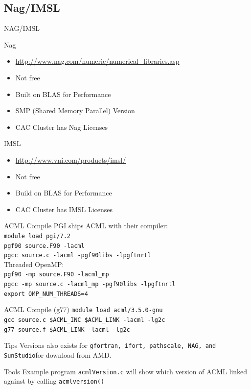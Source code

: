 \documentclass[handout]{beamer}
\begin{document}
\subsection{Nag/IMSL}
\begin{frame}{NAG/IMSL}
 \begin{block}{Nag}
  \begin{itemize}
   \item \url{http://www.nag.com/numeric/numerical\_libraries.asp}
   \item Not free
   \item Built on BLAS for Performance
   \item SMP (Shared Memory Parallel) Version
   \item CAC Cluster has Nag Licenses
  \end{itemize}
 \end{block}
 \begin{block}{IMSL}
  \begin{itemize}
   \item \url{http://www.vni.com/products/imsl/}
   \item Not free
   \item Build on BLAS for Performance
   \item CAC Cluster has IMSL Licenses
  \end{itemize}
 \end{block}
\end{frame}

\begin{frame}{ACML Compile}
PGI ships ACML with their compiler: \\
\texttt{module load pgi/7.2}        \\
\texttt{pgf90 source.F90 -lacml}    \\
\texttt{pgcc  source.c -lacml -pgf90libs -lpgftnrtl} \\
Threaded OpenMP:                    \\
\texttt{pgf90 -mp source.F90 -lacml\_mp}            \\
\texttt{pgcc  -mp source.c   -lacml\_mp -pgf90libs -lpgftnrtl} \\
\texttt{export OMP\_NUM\_THREADS=4}                 \\
\end{frame}
\begin{frame}{ACML Compile (g77)}
\texttt{module load acml/3.5.0-gnu}       \\
\texttt{gcc source.c \$ACML\_INC \$ACML\_LINK -lacml -lg2c} \\
\texttt{g77 source.f \$ACML\_LINK -lacml -lg2c}  \\
\begin{block}{Tips}
Versions also exists for \texttt{gfortran, ifort, pathscale, NAG, and SunStudio}for download from AMD. 
\end{block}
\begin{block}{Tools}
Example program \texttt{acmlVersion.c} will show which version of ACML linked against by calling \texttt{acmlversion()}
\end{block}
\end{frame}
\end{document}

